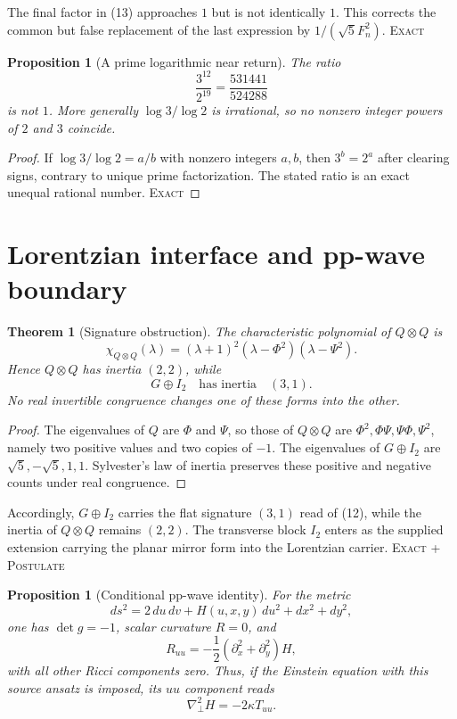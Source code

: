 \documentclass[10pt]{article}
\newtheorem{theorem}[definition]{Theorem}
\newtheorem{proposition}[definition]{Proposition}
\theoremstyle{remark}
\newcommand{\cstatus}[1]{\hfill\textsc{#1}}
\newcommand{\exact}{\textsc{Exact}}
\newcommand{\postulate}{\textsc{Postulate}}
\begin{document}
The final factor in (13) approaches $1$ but is not identically $1$.
This corrects the common but false replacement of the last expression by
$1/(\sqrt5F_n^2)$. \cstatus{\exact}

\begin{proposition}[A prime logarithmic near return]\label{prop:comma}
The ratio
\[
 \frac{3^{12}}{2^{19}}=\frac{531441}{524288}
\tag{14}
\]
is not $1$.  More generally $\log 3/\log 2$ is irrational, so no nonzero
integer powers of $2$ and $3$ coincide.
\end{proposition}

\begin{proof}
If $\log3/\log2=a/b$ with nonzero integers $a,b$, then $3^b=2^a$ after
clearing signs, contrary to unique prime factorization.  The stated ratio is
an exact unequal rational number. \cstatus{\exact}
\end{proof}

\section{Lorentzian interface and pp-wave boundary}

\begin{theorem}[Signature obstruction]\label{thm:signature}
The characteristic polynomial of $Q\otimes Q$ is
\[
 \chi_{Q\otimes Q}(\lambda)=
 (\lambda+1)^2(\lambda-\Phi^2)(\lambda-\Psi^2).
\tag{15}
\]
Hence $Q\otimes Q$ has inertia $(2,2)$, while
\[
 G\oplus I_2\quad\text{has inertia}\quad(3,1).
\tag{16}
\]
No real invertible congruence changes one of these forms into the other.
\end{theorem}

\begin{proof}
The eigenvalues of $Q$ are $\Phi$ and $\Psi$, so those of $Q\otimes Q$ are
$\Phi^2,\Phi\Psi,\Psi\Phi,\Psi^2$, namely two positive values and two
copies of $-1$.  The eigenvalues of $G\oplus I_2$ are
$\sqrt5,-\sqrt5,1,1$.  Sylvester's law of inertia preserves these positive
and negative counts under real congruence.
\end{proof}

Accordingly, $G\oplus I_2$ carries the flat signature $(3,1)$ read of (12),
while the inertia of $Q\otimes Q$ remains $(2,2)$.  The transverse block
$I_2$ enters as the supplied extension carrying the planar mirror form into
the Lorentzian carrier. \cstatus{\exact\; + \postulate}

\begin{proposition}[Conditional pp-wave identity]\label{prop:pp}
For the metric
\[
 ds^2=2\,du\,dv+H(u,x,y)\,du^2+dx^2+dy^2,
\tag{17}
\]
one has $\det g=-1$, scalar curvature $R=0$, and
\[
 R_{uu}=-\frac12(\partial_x^2+\partial_y^2)H,
\tag{18}
\]
with all other Ricci components zero.  Thus, if the Einstein equation with
this source ansatz is imposed, its $uu$ component reads
\[
 \nabla_\perp^2H=-2\kappa T_{uu}.
\tag{19}
\]
\end{proposition}
\end{document}
